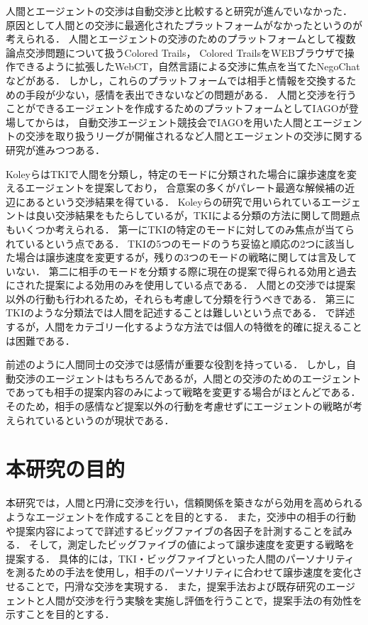 人間とエージェントの交渉は自動交渉と比較すると研究が進んでいなかった．
原因として人間との交渉に最適化されたプラットフォームがなかったというのが考えられる．
人間とエージェントの交渉のためのプラットフォームとして複数論点交渉問題について扱うColored Trails\cite{ct}，
Colored TrailsをWEBブラウザで操作できるように拡張したWebCT\cite{webct}，自然言語による交渉に焦点を当てたNegoChat\cite{negochat}などがある．
しかし，これらのプラットフォームでは相手と情報を交換するための手段が少ない，感情を表出できないなどの問題がある\cite{pinocchio}．
人間と交渉を行うことができるエージェントを作成するためのプラットフォームとしてIAGO\cite{pinocchio, iago}が登場してからは，
自動交渉エージェント競技会でIAGOを用いた人間とエージェントの交渉を取り扱うリーグが開催されるなど人間とエージェントの交渉に関する研究が進みつつある\cite{hal-2017, hal-2018, hal-2019}．

Koleyら\cite{tki-ha}はTKI\cite{tki}で人間を分類し，特定のモードに分類された場合に譲歩速度を変えるエージェントを提案しており，
合意案の多くがパレート最適な解候補の近辺にあるという交渉結果を得ている．
Koleyらの研究で用いられているエージェントは良い交渉結果をもたらしているが，TKIによる分類の方法に関して問題点もいくつか考えられる．
第一にTKIの特定のモードに対してのみ焦点が当てられているという点である．
TKIの5つのモードのうち妥協と順応の2つに該当した場合は譲歩速度を変更するが，残りの3つのモードの戦略に関しては言及していない．
第二に相手のモードを分類する際に現在の提案で得られる効用と過去にされた提案による効用のみを使用している点である．
人間との交渉では提案以外の行動も行われるため，それらも考慮して分類を行うべきである．
第三にTKIのような分類法では人間を記述することは難しいという点である．
で詳述するが，人間をカテゴリー化するような方法では個人の特徴を的確に捉えることは困難である．

前述のように人間同士の交渉では感情が重要な役割を持っている．
しかし，自動交渉のエージェントはもちろんであるが，人間との交渉のためのエージェントであっても相手の提案内容のみによって戦略を変更する場合がほとんどである．
そのため，相手の感情など提案以外の行動を考慮せずにエージェントの戦略が考えられているというのが現状である．

\section{本研究の目的}
本研究では，人間と円滑に交渉を行い，信頼関係を築きながら効用を高められるようなエージェントを作成することを目的とする．
また，交渉中の相手の行動や提案内容によってで詳述するビッグファイブの各因子を計測することを試みる．
そして，測定したビッグファイブの値によって譲歩速度を変更する戦略を提案する．
具体的には，TKI・ビッグファイブといった人間のパーソナリティを測るための手法を使用し，相手のパーソナリティに合わせて譲歩速度を変化させることで，円滑な交渉を実現する．
また，提案手法および既存研究のエージェントと人間が交渉を行う実験を実施し評価を行うことで，提案手法の有効性を示すことを目的とする．

